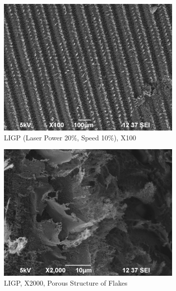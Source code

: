 \begin{figure}[H]
\begin{subfigure}{0.49\textwidth}
  \includegraphics[width=\linewidth]{Figures/Results/SEM/LIGP_PI_1.jpg}
  \caption{LIGP (Laser Power 20$\%$, Speed 10$\%$), X100}
  \label{fig:SEM1}
\end{subfigure}\hfil
\begin{subfigure}{0.49\textwidth}
  \includegraphics[width=\linewidth]{Figures/Results/SEM/LIGP_PI_2.jpg}
  \caption{LIGP, X2000, Porous Structure of Flakes}
  \label{fig:SEM3}
\end{subfigure}\hfil
\medskip
\begin{subfigure}{0.49\textwidth}

\end{subfigure}
\end{figure}
